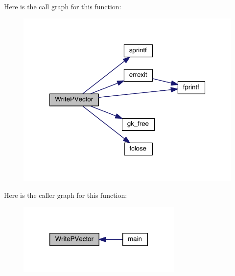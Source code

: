 Here is the call graph for this function\+:\nopagebreak
\begin{figure}[H]
\begin{center}
\leavevmode
\includegraphics[width=320pt]{a00954_a19b5376612558b2381990f2e7a06bffc_cgraph}
\end{center}
\end{figure}
Here is the caller graph for this function\+:\nopagebreak
\begin{figure}[H]
\begin{center}
\leavevmode
\includegraphics[width=230pt]{a00954_a19b5376612558b2381990f2e7a06bffc_icgraph}
\end{center}
\end{figure}
